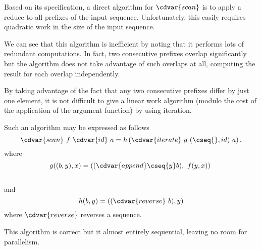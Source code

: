 \begin{gram}
Based on its specification, a direct algorithm for $\cdvar{scan}$ is to
apply a reduce to all prefixes of the input sequence.  
%
Unfortunately, this easily requires quadratic work in the size of the
input sequence.
%

We can see that this algorithm is inefficient by noting that it
performs lots of redundant computations.  In fact, two consecutive
prefixes overlap significantly but the algorithm does not take
advantage of such overlaps at all, computing the result for each
overlap independently. 
%

By taking advantage of the fact that any two consecutive prefixes
differ by just one element, it is not difficult to give a linear work
algorithm (modulo the cost of the application of the argument
function) by using iteration.  

Such an algorithm may be expressed as
follows
\[
\cdvar{scan}~f~\cdvar{id}~{a} = h \left( \cdvar{iterate}~g~(\cseq{},id)~a \right), 
\]
where
\[ 
g((b, y), x) = ((\cdvar{append} \cseq{y} b),~f(y,x))~
\]
\\
and 
\\
\[
h (b,y) = ((\cdvar{reverse}~b), y)
\]
where $\cdvar{reverse}$ reverses a sequence.
%

This algorithm is correct but it almost entirely sequential, leaving
no room for parallelism.

\end{gram}


